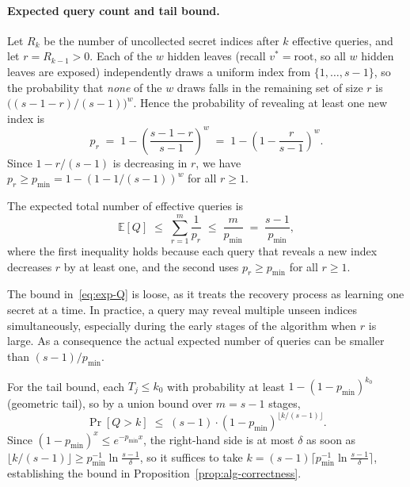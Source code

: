 \paragraph{Expected query count and tail bound.}
Let $R_k$ be the number of uncollected secret indices after $k$ effective
queries, and let $r = R_{k-1} > 0$.  Each of the $w$ hidden leaves
(recall $v^* = \mathrm{root}$, so all $w$ hidden leaves are exposed)
independently draws a uniform index from $\{1,\ldots,s-1\}$,
so the probability that \emph{none} of the $w$ draws falls in the
remaining set of size $r$ is $\bigl((s-1-r)/(s-1)\bigr)^{w}$.
Hence the probability of revealing at least one new index is
\begin{equation}
  p_r \;=\; 1 - \left(\frac{s-1-r}{s-1}\right)^{\!w}
           \;=\; 1 - \left(1 - \frac{r}{s-1}\right)^{\!w}.
  \label{eq:pr-exact}
\end{equation}
Since $1 - r/(s-1)$ is decreasing in $r$, we have
$p_r \geq p_{\min} = 1-(1-1/(s-1))^w$ for all $r \geq 1$.

The expected total number of effective queries is
\begin{equation}
  \mathbb{E}[Q] \;\leq\; \sum_{r=1}^{m} \frac{1}{p_r}
  \;\leq\; \frac{m}{p_{\min}} \;=\; \frac{s-1}{p_{\min}},
  \label{eq:exp-Q}
\end{equation}
where the first inequality holds because each query that reveals a new index
decreases $r$ by at least one, and the second uses $p_r \geq p_{\min}$ for
all $r \geq 1$.

\begin{remark}
The bound in~\eqref{eq:exp-Q} is loose, as it treats the recovery
process as learning one secret at a time. In practice, a query may reveal multiple unseen indices
simultaneously, especially during the early stages of the
algorithm when $r$ is large. As a consequence the actual expected
number of queries can be smaller than $(s-1)/p_{\min}$.
\end{remark}

For the tail bound, each $T_j \leq k_0$ with probability at least
$1 - (1 - p_{\min})^{k_0}$ (geometric tail), so by a union bound over
$m = s-1$ stages,
\[
  \Pr[Q > k] \;\leq\; (s-1)\cdot(1-p_{\min})^{\lfloor k/(s-1)\rfloor}.
\]
Since $(1-p_{\min})^{x} \leq e^{-p_{\min} x}$, the right-hand side is at
most $\delta$ as soon as $\lfloor k/(s-1)\rfloor \geq p_{\min}^{-1}
\ln\tfrac{s-1}{\delta}$, so it suffices to take
$k = (s-1)\bigl\lceil p_{\min}^{-1} \ln\tfrac{s-1}{\delta} \bigr\rceil$,
establishing the bound in Proposition~\ref{prop:alg-correctness}.

